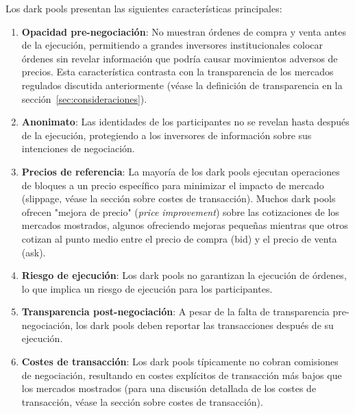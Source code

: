 \begin{teorema}
Los dark pools presentan las siguientes características principales:

\begin{enumerate}
\item \textbf{Opacidad pre-negociación}: No muestran órdenes de compra y venta antes de la ejecución, permitiendo a grandes inversores institucionales colocar órdenes sin revelar información que podría causar movimientos adversos de precios. Esta característica contrasta con la transparencia de los mercados regulados discutida anteriormente (véase la definición de transparencia en la sección~\ref{sec:consideraciones}).

\item \textbf{Anonimato}: Las identidades de los participantes no se revelan hasta después de la ejecución, protegiendo a los inversores de información sobre sus intenciones de negociación.

\item \textbf{Precios de referencia}: La mayoría de los dark pools ejecutan operaciones de bloques a un precio específico para minimizar el impacto de mercado (slippage, véase la sección sobre costes de transacción). Muchos dark pools ofrecen "mejora de precio" (\textit{price improvement}) sobre las cotizaciones de los mercados mostrados, algunos ofreciendo mejoras pequeñas mientras que otros cotizan al punto medio entre el precio de compra (bid) y el precio de venta (ask).

\item \textbf{Riesgo de ejecución}: Los dark pools no garantizan la ejecución de órdenes, lo que implica un riesgo de ejecución para los participantes.

\item \textbf{Transparencia post-negociación}: A pesar de la falta de transparencia pre-negociación, los dark pools deben reportar las transacciones después de su ejecución.

\item \textbf{Costes de transacción}: Los dark pools típicamente no cobran comisiones de negociación, resultando en costes explícitos de transacción más bajos que los mercados mostrados (para una discusión detallada de los costes de transacción, véase la sección sobre costes de transacción).
\end{enumerate}
\end{teorema}

